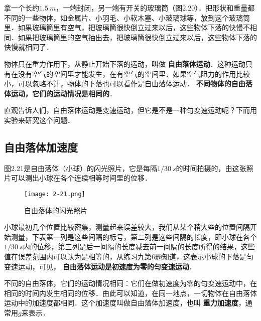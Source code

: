 拿一个长约$\qty{1.5}{m}$，一端封闭，另一端有开关的玻璃筒（图2.20）．把形状和重量都不同的一些物体，如金属片、小羽毛、小软木塞、小玻璃球等，放到这个玻璃筒里．如果玻璃筒里有空气，把玻璃筒很快倒立过来以后，这些物体下落的快慢不相同．如果把玻璃筒里的空气抽出去，把玻璃筒很快倒立过来以后，这些物体下落的快慢就相同了．

物体只在重力作用下，从静止开始下落的运动，叫做\textbf{ 自由落体运动}．这种运动只有在没有空气的空间里才能发生，在有空气的空间里．如果空气阻力的作用比较小，可以忽略不计，物体的下落也可以看作是自由落体运动．\textbf{ 不同物体的自由落体运动，它们的运动情况是相同的}．

直观告诉人们，自由落体运动是变速运动，但它是不是一种匀变速运动呢？下而用实验来研究这个问题．



\subsection{自由落体加速度}
图2.21是自由落体（小球）的闪光照片，它是每隔$1/30~\si{s}$的时间拍摄的，由这张照片可以测出小球在各个连续相等时间里的位移．
\begin{figure}[H]
    \centering
    \texttt{[image: 2-21.png]}
    \caption{自由落体的闪光照片}
\end{figure}

小球最初几个位置比较密集，测量起来误差较大，我们从某个稍大些的位置间隔开始测量，下表第一列是这些间隔的标号，第二列是这些间隔的长度，即小球在各个$1/30~\si{s}$内的位移，第三列是后一间隔的长度减去前一间隔的长度所得的结果，这些值在误差范围内可以认为是相等的，从练习九第6题知道，这表示小球的下落是匀变速运动，可见，\textbf{ 自由落体运动是初速度为零的匀变速运动}．

不同的自由落体，它们的运动情况相同：它们在做初速度为零的匀变速运动中，在相同的时间内发生相同的位移．由此可以知道，在同一地点，一切物体在自由落体运动中的加速度都相同．这个加速度叫做自由落体加速度，也叫\textbf{ 重力加速度}，通常用$g$来表示．

